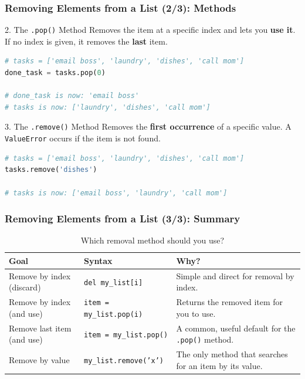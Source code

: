 \documentclass{beamer}
\begin{document}
\begin{frame}[fragile]
    \frametitle{Removing Elements from a List (2/3): Methods}
    
    \begin{block}{2. The \texttt{.pop()} Method}
        Removes the item at a specific index and lets you \textbf{use it}. If no index is given, it removes the \textbf{last} item.
\begin{lstlisting}[language=Python]
# tasks = ['email boss', 'laundry', 'dishes', 'call mom']
done_task = tasks.pop(0)

# done_task is now: 'email boss'
# tasks is now: ['laundry', 'dishes', 'call mom']
\end{lstlisting}
    \end{block}
    
    \pause
    
    \begin{block}{3. The \texttt{.remove()} Method}
        Removes the \textbf{first occurrence} of a specific value. A \texttt{ValueError} occurs if the item is not found.
\begin{lstlisting}[language=Python]
# tasks = ['email boss', 'laundry', 'dishes', 'call mom']
tasks.remove('dishes')

# tasks is now: ['email boss', 'laundry', 'call mom']
\end{lstlisting}
    \end{block}
    
\end{frame}

\begin{frame}[fragile]
    \frametitle{Removing Elements from a List (3/3): Summary}
    
    \begin{table}
        \centering
        \caption{Which removal method should you use?}
        \begin{tabular}{l l p{6cm}}
            \hline
            \textbf{Goal} & \textbf{Syntax} & \textbf{Why?} \\
            \hline \hline
            Remove by index (discard) & \texttt{del my\_list[i]} & Simple and direct for removal by index. \\
            \hline
            Remove by index (and use) & \texttt{item = my\_list.pop(i)} & Returns the removed item for you to use. \\
            \hline
            Remove last item (and use) & \texttt{item = my\_list.pop()} & A common, useful default for the \texttt{.pop()} method. \\
            \hline
            Remove by value & \texttt{my\_list.remove('x')} & The only method that searches for an item by its value. \\
            \hline
        \end{tabular}
    \end{table}
    
\end{frame}
\end{document}
